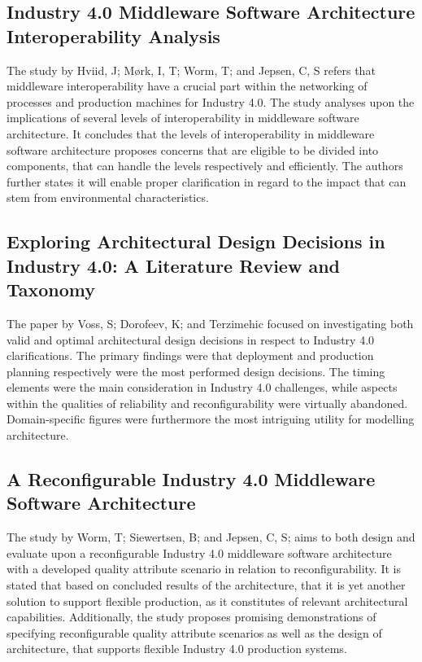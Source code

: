 \subsection{Industry 4.0 Middleware Software Architecture Interoperability Analysis}
The study by Hviid, J; Mørk, I, T; Worm, T; and Jepsen, C, S refers that middleware interoperability have a crucial part within the networking of processes and production machines for Industry 4.0. The study analyses upon the implications of several levels of interoperability in middleware software architecture. It concludes that the levels of interoperability in middleware software architecture proposes concerns that are eligible to be divided into components, that can handle the levels respectively and efficiently. The authors further states it will enable proper clarification in regard to the impact that can stem from environmental characteristics\cite{Jepsen202132}. 
\subsection{Exploring Architectural Design Decisions in Industry 4.0: A Literature Review and Taxonomy}
The paper by Voss, S; Dorofeev, K; and Terzimehic focused on investigating both valid and optimal architectural design decisions in respect to Industry 4.0 clarifications. The primary findings were that deployment and production planning respectively were the most performed design decisions. The timing elements were the main consideration in Industry 4.0 challenges, while aspects within the qualities of reliability and reconfigurability were virtually abandoned. Domain-specific figures were furthermore the most intriguing utility for modelling architecture\cite{Terzimehić202287}. 
\subsection{A Reconfigurable Industry 4.0 Middleware Software Architecture}
The study by Worm, T; Siewertsen, B; and Jepsen, C, S; aims to both design and evaluate upon a reconfigurable Industry 4.0 middleware software architecture with a developed quality attribute scenario in relation to reconfigurability. It is stated that based on concluded results of the architecture, that it is yet another solution to support flexible production, as it constitutes of relevant architectural capabilities. Additionally, the study proposes promising demonstrations of specifying reconfigurable quality attribute scenarios as well as the design of architecture, that supports flexible Industry 4.0 production systems\cite{Jepsen202343}.
